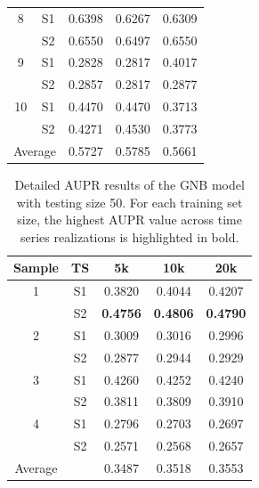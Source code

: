 \begin{table}[!h]
{\begin{tabular}{c cccc}
8 & S1 & 0.6398 & 0.6267 & 0.6309 \\
  & S2 & 0.6550 & 0.6497 & 0.6550 \\

9 & S1 & 0.2828 & 0.2817 & 0.4017 \\
  & S2 & 0.2857 & 0.2817 & 0.2877 \\

10 & S1 & 0.4470 & 0.4470 & 0.3713 \\
   & S2 & 0.4271 & 0.4530 & 0.3773 \\
\midrule
\multicolumn{2}{c}{Average}
& 0.5727 & 0.5785 & 0.5661 \\
\bottomrule
\end{tabular}
}
\end{table}

\begin{table}[!h]
\centering
\caption{Detailed AUPR results of the GNB model with testing size 50. For each training set size, the highest AUPR value across time series realizations is highlighted in bold.}
\label{tab:supp_test50}
{\renewcommand{\arraystretch}{0.9}
\setlength{\tabcolsep}{6pt}
\begin{tabular}{c cccc}
\toprule
Sample & TS & 5k & 10k & 20k \\
\midrule
1 & S1 & 0.3820 & 0.4044 & 0.4207 \\
  & S2 & \textbf{0.4756} & \textbf{0.4806} & \textbf{0.4790} \\

2 & S1 & 0.3009 & 0.3016 & 0.2996 \\
  & S2 & 0.2877 & 0.2944 & 0.2929 \\

3 & S1 & 0.4260 & 0.4252 & 0.4240 \\
  & S2 & 0.3811 & 0.3809 & 0.3910 \\

4 & S1 & 0.2796 & 0.2703 & 0.2697 \\
  & S2 & 0.2571 & 0.2568 & 0.2657 \\
\midrule
Average &  & 0.3487 & 0.3518 & 0.3553 \\
\bottomrule
\end{tabular}
}
\end{table}

\makeatletter
\setlength{\@fptop}{0pt}
\makeatother


